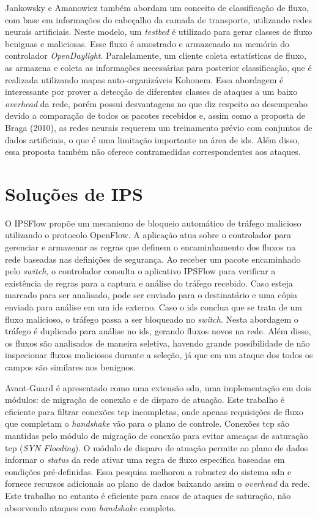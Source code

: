 Jankowsky e Amanowicz \cite{JankowskyAmanowicz:2015}  também abordam um conceito de classificação de fluxo, com base em informações do cabeçalho da camada de transporte, utilizando redes neurais artificiais. Neste modelo, um \textit{testbed} é utilizado para gerar classes de fluxo benignas e maliciosas. Esse fluxo é amostrado e armazenado na memória do controlador \textit{OpenDaylight}. Paralelamente, um cliente coleta estatísticas de fluxo, as armazena e coleta as informações necessárias para posterior classificação, que é realizada utilizando mapas auto-organizáveis Kohonem. Essa abordagem é interessante por prover a detecção de diferentes classes de ataques a um baixo \textit{overhead} da rede, porém possui desvantagens no que diz respeito ao desempenho devido a comparação de todos os pacotes recebidos e, assim como a proposta de Braga (2010), as redes neurais requerem um treinamento prévio com conjuntos de dados artificiais, o que é uma limitação importante na área de \gls{ids}. Além disso, essa proposta também não oferece contramedidas correspondentes aos ataques.

\section{Soluções de IPS}

O IPSFlow \cite{Nagahama:2012} propõe um mecanismo de bloqueio automático de tráfego malicioso utilizando o protocolo OpenFlow. A aplicação atua sobre o controlador para gerenciar e armazenar as regras que definem o encaminhamento dos fluxos na rede baseadas nas definições de segurança. Ao receber um pacote encaminhado pelo \textit{switch}, o controlador consulta o aplicativo IPSFlow para verificar a existência de regras para a captura e análise do tráfego recebido. Caso esteja marcado para ser analisado, pode ser enviado para o destinatário e uma cópia enviada para análise em um \gls{ids} externo. Caso o \gls{ids} conclua que se trata de um fluxo malicioso, o tráfego passa a ser bloqueado no \textit{switch}. Nesta abordagem o tráfego é duplicado para análise no \gls{ids}, gerando fluxos novos na rede. Além disso, os fluxos são analisados de maneira seletiva, havendo grande possibilidade de não inspecionar fluxos maliciosos durante a seleção, já que em um ataque \gls{dos} todos os campos são similares aos benignos.

Avant-Guard \cite{Shin:2013} é apresentado como uma extensão \gls{sdn}, uma implementação em dois módulos: de migração de conexão e de disparo de atuação. Este trabalho é eficiente para filtrar conexões \gls{tcp} incompletas, onde apenas requisições de fluxo que completam o \textit{handshake} vão para o plano de controle. Conexões \gls{tcp} são mantidas pelo módulo de migração de conexão para evitar ameaças de saturação \gls{tcp} (\textit{SYN Flooding}). O módulo de disparo de atuação permite ao plano de dados informar o \textit{status} da rede ativar uma regra de fluxo específica baseadas em condições pré-definidas. Essa pesquisa melhorou a robustez do sistema \gls{sdn} e fornece recursos adicionais ao plano de dados baixando assim o \textit{overhead} da rede. Este trabalho no entanto é eficiente para casos de ataques de saturação, não absorvendo ataques com \textit{handshake} completo.


